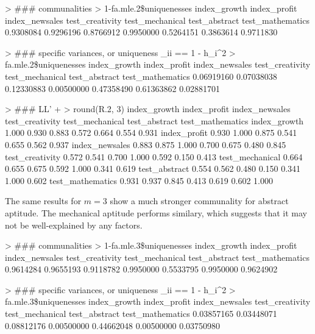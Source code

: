 \begin{enumerate}
\begin{rc}

> ### communalities
> 1-fa.mle.2\$uniquenesses
index_growth     index_profit     index_newsales   test_creativity  test_mechanical  test_abstract    test_mathematics 
0.9308084        0.9296196        0.8766912        0.9950000        0.5264151        0.3863614        0.9711830 

> ### specific variances, or uniqueness \Phi_ii == 1 - h_i^2
> fa.mle.2\$uniquenesses
index_growth     index_profit     index_newsales   test_creativity  test_mechanical  test_abstract    test_mathematics 
0.06919160       0.07038038       0.12330883       0.00500000       0.47358490       0.61363862       0.02881701 

> ### LL' + \Phi
> round(R.2, 3)
                 index_growth index_profit index_newsales test_creativity test_mechanical test_abstract test_mathematics
index_growth            1.000        0.930          0.883           0.572           0.664         0.554            0.931
index_profit            0.930        1.000          0.875           0.541           0.655         0.562            0.937
index_newsales          0.883        0.875          1.000           0.700           0.675         0.480            0.845
test_creativity         0.572        0.541          0.700           1.000           0.592         0.150            0.413
test_mechanical         0.664        0.655          0.675           0.592           1.000         0.341            0.619
test_abstract           0.554        0.562          0.480           0.150           0.341         1.000            0.602
test_mathematics        0.931        0.937          0.845           0.413           0.619         0.602            1.000

\end{rc}

	The same results for $m=3$ show a much stronger communality for abstract aptitude. The mechanical aptitude performs similary, which suggests that it may not be well-explained by any factors.

\begin{rc}

> ### communalities
> 1-fa.mle.3\$uniquenesses
index_growth     index_profit     index_newsales   test_creativity  test_mechanical  test_abstract    test_mathematics 
0.9614284        0.9655193        0.9118782        0.9950000        0.5533795        0.9950000        0.9624902 

> ### specific variances, or uniqueness \Phi_ii == 1 - h_i^2
> fa.mle.3\$uniquenesses
index_growth     index_profit     index_newsales   test_creativity  test_mechanical  test_abstract    test_mathematics 
0.03857165       0.03448071       0.08812176       0.00500000       0.44662048       0.00500000       0.03750980 


\end{rc}
\end{enumerate}

